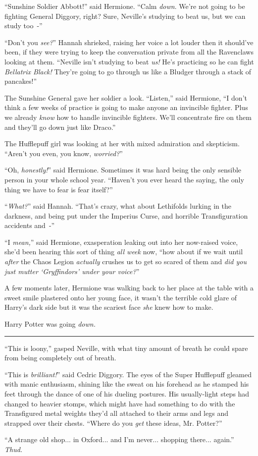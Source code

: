 ``Sunshine Soldier Abbott!'' said Hermione. ``Calm \emph{down}. We're not going to be fighting General Diggory, right? Sure, Neville's studying to beat us, but we can study too~-''

``Don't you \emph{see?}'' Hannah shrieked, raising her voice a lot louder then it should've been, if they were trying to keep the conversation private from all the Ravenclaws looking at them. ``Neville isn't studying to beat \emph{us!} He's practicing so he can fight \emph{Bellatrix Black!} They're going to go through us like a Bludger through a stack of pancakes!''

The Sunshine General gave her soldier a look. ``Listen,'' said Hermione, ``I don't think a few weeks of practice is going to make anyone an invincible fighter. Plus we already \emph{know} how to handle invincible fighters. We'll concentrate fire on them and they'll go down just like Draco.''

The Hufflepuff girl was looking at her with mixed admiration and skepticism. ``Aren't you even, you know, \emph{worried?}''

``Oh, \emph{honestly!}'' said Hermione. Sometimes it was hard being the only sensible person in your whole school year. ``Haven't you ever heard the saying, the only thing we have to fear is fear itself?''

``\emph{What?}'' said Hannah. ``That's crazy, what about Lethifolds lurking in the darkness, and being put under the Imperius Curse, and horrible Transfiguration accidents and~-''

``I \emph{mean,}'' said Hermione, exasperation leaking out into her now-raised voice, she'd been hearing this sort of thing \emph{all week} now, ``how about if we wait until \emph{after} the Chaos Legion \emph{actually} crushes us to get so scared of them and \emph{did you just mutter `Gryffindors' under your voice?}''

A few moments later, Hermione was walking back to her place at the table with a sweet smile plastered onto her young face, it wasn't the terrible cold glare of Harry's dark side but it was the scariest face \emph{she} knew how to make.

Harry Potter was going \emph{down.}

\begin{center}\rule{3in}{0.4pt}\end{center}

``This is loony,'' gasped Neville, with what tiny amount of breath he could spare from being completely out of breath.

``This is \emph{brilliant!}'' said Cedric Diggory. The eyes of the Super Hufflepuff gleamed with manic enthusiasm, shining like the sweat on his forehead as he stamped his feet through the dance of one of his dueling postures. His usually-light steps had changed to heavier stomps, which might have had something to do with the Transfigured metal weights they'd all attached to their arms and legs and strapped over their chests. ``Where do you \emph{get} these ideas, Mr. Potter?''

``A strange old shop... in Oxford... and I'm never... shopping there... again.'' \emph{Thud.}
